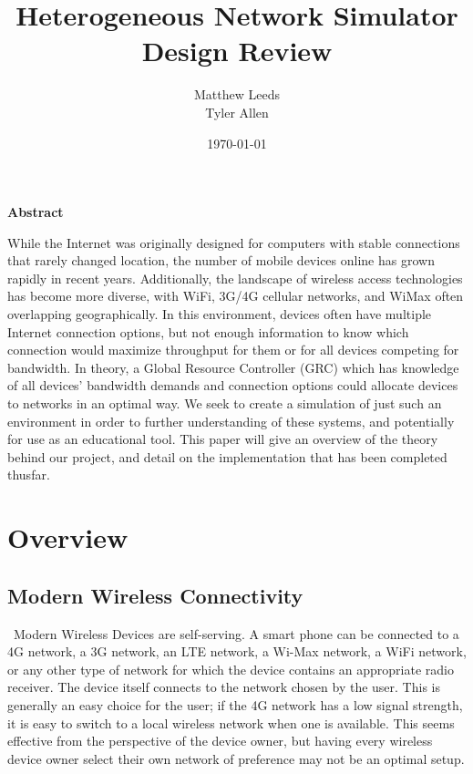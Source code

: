 \documentclass[11pt]{article}
\title{Heterogeneous Network Simulator Design Review}
\author{Matthew Leeds\\
	Tyler Allen\\}
\date{\today}
\begin{document}
\maketitle

{\setlength{\parindent}{0cm} \large \textbf{Abstract}}

While the Internet was originally designed for computers with stable connections 
that rarely changed location, the number of mobile devices online has grown 
rapidly in recent years. Additionally, the landscape of wireless access 
technologies has become more diverse, with WiFi, 3G/4G cellular networks, and 
WiMax often overlapping geographically. In this environment, devices often have 
multiple Internet connection options, but not enough information to know which 
connection would maximize throughput for them or for all devices competing for 
bandwidth. In theory, a Global Resource Controller (GRC) which has knowledge 
of all devices' bandwidth demands and connection options could allocate devices 
to networks in an optimal way. We seek to create a simulation of just such an 
environment in order to further understanding of these systems, and potentially 
for use as an educational tool. This paper will give an overview of the theory 
behind our project, and detail on the implementation that has been completed 
thusfar.

\section{Overview}
\subsection{Modern Wireless Connectivity}
~\indent Modern Wireless Devices are self-serving. A smart phone can be connected to a
4G network, a 3G network, an LTE network, a Wi-Max network, a WiFi network, 
or any other type of network for which the device contains an appropriate 
radio receiver. The device itself connects to the network chosen by the user. 
This is generally an easy choice for the user; if the 4G network has a 
low signal strength, it is easy to switch to a local wireless network when one 
is available. This seems effective from the perspective of the device owner, 
but having every wireless device owner select their own network of preference 
may not be an optimal setup.
\end{document}
